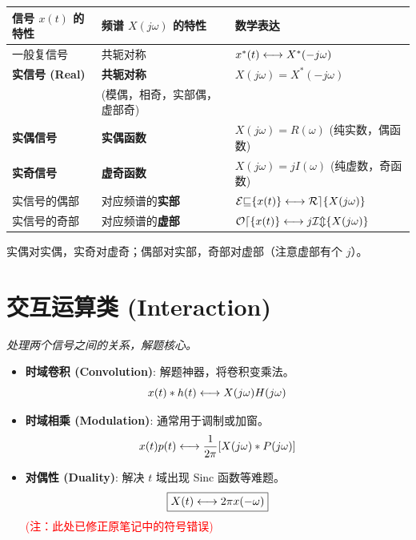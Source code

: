 \begin{table}[h!]
    \centering
    
\renewcommand{\arraystretch}{1.4}
    \begin{tabularx}{\textwidth}{@{} l L L @{}}
        \toprule
        \textbf{信号 $x(t)$ 的特性} & \textbf{频谱 $X(j\omega)$ 的特性} & \textbf{数学表达} \\
        \midrule
        一般复信号 & 共轭对称 & $x^*(t) \longleftrightarrow X^*(-j\omega)$ \\
        \textbf{实信号 (Real)} & \textbf{共轭对称} & $X(j\omega) = X^*(-j\omega)$ \\
        & \small{(模偶，相奇，实部偶，虚部奇)} & \\
        \textbf{实偶信号} & \textbf{实偶函数} & $X(j\omega) = R(\omega)$ \small{(纯实数，偶函数)} \\
 
       \textbf{实奇信号} & \textbf{虚奇函数} & $X(j\omega) = jI(\omega)$ \small{(纯虚数，奇函数)} \\
        实信号的偶部 & 对应频谱的\textbf{实部} & $\mathcal{Ev}\{x(t)\} \longleftrightarrow \mathcal{Re}\{X(j\omega)\}$ \\
        实信号的奇部 & 对应频谱的\textbf{虚部} & $\mathcal{Od}\{x(t)\} \longleftrightarrow j\mathcal{Im}\{X(j\omega)\}$ \\
        \bottomrule
    \end{tabularx}
\end{table}

\begin{tcolorbox}[title= 记忆口诀]
实偶对实偶，实奇对虚奇；偶部对实部，奇部对虚部（注意虚部有个 $j$）。
\end{tcolorbox}

\section{交互运算类 (Interaction)}
\textit{处理两个信号之间的关系，解题核心。}

\begin{itemize}[leftmargin=1cm, itemsep=8pt]
    \item \textbf{时域卷积 (Convolution)}: 解题神器，将卷积变乘法。
    \[ x(t) * h(t) \longleftrightarrow X(j\omega)H(j\omega) \]
    
    \item \textbf{时域相乘 (Modulation)}: 通常用于调制或加窗。
    \[ 
x(t)p(t) \longleftrightarrow \frac{1}{2\pi} [X(j\omega) * P(j\omega)] \]
    
    \item \textbf{对偶性 (Duality)}: 解决 $t$ 域出现 Sinc 函数等难题。
    \[ \boxed{X(t) \longleftrightarrow 2\pi x(-\omega)} \]
    \textcolor{red}{\small (注：此处已修正原笔记中的符号错误)}
\end{itemize}

